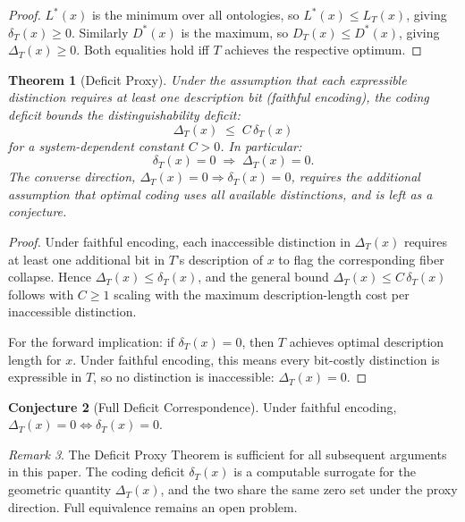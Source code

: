 \documentclass[12pt, a4paper]{article}
\theoremstyle{plain}
\newtheorem{theorem}{Theorem}[section]
\theoremstyle{definition}
\newtheorem{conjecture}[theorem]{Conjecture}
\theoremstyle{remark}
\newtheorem{remark}[theorem]{Remark}
\newcommand{\Lreach}{L_T}
\newcommand{\Lopt}{L^*}
\begin{document}
\begin{proof}
$\Lopt(x)$ is the minimum over all ontologies, so $\Lopt(x)\le\Lreach(x)$,
giving $\delta_T(x)\ge 0$. Similarly $D^*(x)$ is the maximum, so
$D_T(x)\le D^*(x)$, giving $\Delta_T(x)\ge 0$. Both equalities hold iff
$T$ achieves the respective optimum.
\end{proof}

\begin{theorem}[Deficit Proxy]
\label{thm:proxy}
Under the assumption that each expressible distinction requires at least one
description bit (\emph{faithful encoding}), the coding deficit bounds the
distinguishability deficit:
\[
  \Delta_T(x) \;\le\; C\,\delta_T(x)
\]
for a system-dependent constant $C>0$. In particular:
\[
  \delta_T(x)=0 \;\Longrightarrow\; \Delta_T(x)=0.
\]
The converse direction, $\Delta_T(x)=0\Rightarrow\delta_T(x)=0$, requires
the additional assumption that optimal coding uses all available distinctions,
and is left as a conjecture.
\end{theorem}

\begin{proof}
Under faithful encoding, each inaccessible distinction in $\Delta_T(x)$
requires at least one additional bit in $T$'s description of $x$ to flag
the corresponding fiber collapse. Hence $\Delta_T(x)\le\delta_T(x)$,
and the general bound $\Delta_T(x)\le C\,\delta_T(x)$ follows with $C\ge 1$
scaling with the maximum description-length cost per inaccessible distinction.

For the forward implication: if $\delta_T(x)=0$, then $T$ achieves optimal
description length for $x$. Under faithful encoding, this means every
bit-costly distinction is expressible in $T$, so no distinction is
inaccessible: $\Delta_T(x)=0$.
\end{proof}

\begin{conjecture}[Full Deficit Correspondence]
\label{conj:full-corr}
Under faithful encoding, $\Delta_T(x)=0\iff\delta_T(x)=0$.
\end{conjecture}

\begin{remark}
The Deficit Proxy Theorem is sufficient for all subsequent arguments in
this paper. The coding deficit $\delta_T(x)$ is a computable surrogate
for the geometric quantity $\Delta_T(x)$, and the two share the same zero
set under the proxy direction. Full equivalence remains an open problem.
\end{remark}
\end{document}
